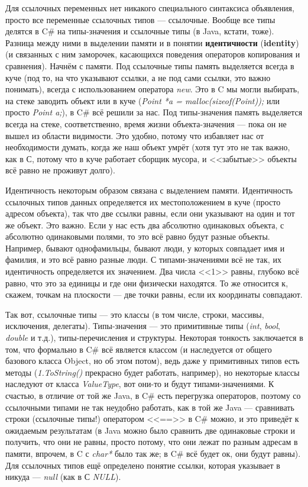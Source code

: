 \documentclass{../../text-style}
\begin{document}
Для ссылочных переменных нет никакого специального синтаксиса объявления, просто все переменные ссылочных типов --- ссылочные. Вообще все типы делятся в C\# на типы-значения и ссылочные типы (в Java, кстати, тоже). Разница между ними в выделении памяти и в понятии \textbf{идентичности} (\textbf{identity}) (и связанных с ним заморочек, касающихся поведения операторов копирования и сравнения). Начнём с памяти. Под ссылочные типы память выделяется всегда в куче (под то, на что указывают ссылки, а не под сами ссылки, это важно понимать), всегда с использованием оператора \textit{new}. Это в C мы могли выбирать, на стеке заводить объект или в куче (\textit{Point *a = malloc(sizeof(Point));} или просто \textit{Point a;}), в C\# всё решили за нас. Под типы-значения память выделяется всегда на стеке, соответственно, время жизни объекта-значения --- пока он не вышел из области видимости. Это удобно, потому что избавляет нас от необходимости думать, когда же наш объект умрёт (хотя тут это не так важно, как в С, потому что в куче работает сборщик мусора, и <<забытые>> объекты всё равно не проживут долго).

Идентичность некоторым образом связана с выделением памяти. Идентичность ссылочных типов данных определяется их местоположением в куче (просто адресом объекта), так что две ссылки равны, если они указывают на один и тот же объект. Это важно. Если у нас есть два абсолютно одинаковых объекта, с абсолютно одинаковыми полями, то это всё равно будут разные объекты. Например, бывают однофамильцы, бывают люди, у которых совпадает имя и фамилия, и это всё равно разные люди. С типами-значениями всё не так, их идентичность определяется их значением. Два числа <<1>> равны, глубоко всё равно, что это за единицы и где они физически находятся. То же относится к, скажем, точкам на плоскости --- две точки равны, если их координаты совпадают.

Так вот, ссылочные типы --- это классы (в том числе, строки, массивы, исключения, делегаты). Типы-значения --- это примитивные типы (\textit{int}, \textit{bool}, \textit{double} и т.д.), типы-перечисления и структуры. Некоторая тонкость заключается в том, что формально в C\# всё является классом (и наследуется от общего базового класса Object, но об этом потом), ведь даже у примитивных типов есть методы (\textit{1.ToString()} прекрасно будет работать, например), но некоторые классы наследуют от класса \textit{ValueType}, вот они-то и будут типами-значениями. К счастью, в отличие от той же Java, в C\# есть перегрузка операторов, поэтому со ссылочными типами не так неудобно работать, как в той же Java --- сравнивать строки (ссылочные типы!) оператором <<==>> в C\# можно, и это приведёт к ожидаемым результатам (в Java можно было сравнить две одинаковые строки и получить, что они не равны, просто потому, что они лежат по разным адресам в памяти, впрочем, в C с \textit{char*} было так же; в C\# всё будет ок, они будут равны). Для ссылочных типов ещё определено понятие ссылки, которая указывает в никуда --- \textit{null} (как в С \textit{NULL}).
\end{document}
